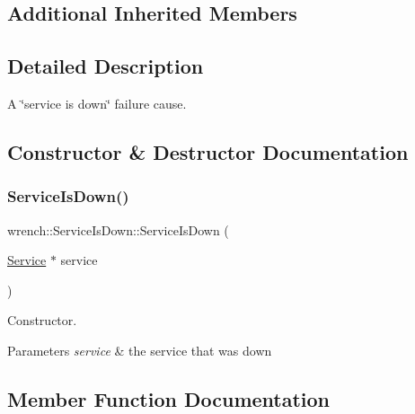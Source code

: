 \subsection*{Additional Inherited Members}


\subsection{Detailed Description}
A \char`\"{}service is down\char`\"{} failure cause. 

\subsection{Constructor \& Destructor Documentation}
\mbox{\label{classwrench_1_1_service_is_down_aa126c61019d1c3131c8ac71454c30ef5}} 
\subsubsection{\texorpdfstring{Service\+Is\+Down()}{ServiceIsDown()}}
{\footnotesize\ttfamily wrench\+::\+Service\+Is\+Down\+::\+Service\+Is\+Down (\begin{DoxyParamCaption}\item[{\hyperlink{classwrench_1_1_service}{Service} $\ast$}]{service }\end{DoxyParamCaption})\hspace{0.3cm}{\ttfamily [explicit]}}



Constructor. 


\begin{DoxyParams}{Parameters}
{\em service} & the service that was down \\
\hline
\end{DoxyParams}


\subsection{Member Function Documentation}
\mbox{\label{classwrench_1_1_service_is_down_a1e92883f2634958f1af834d791097c90}} 
